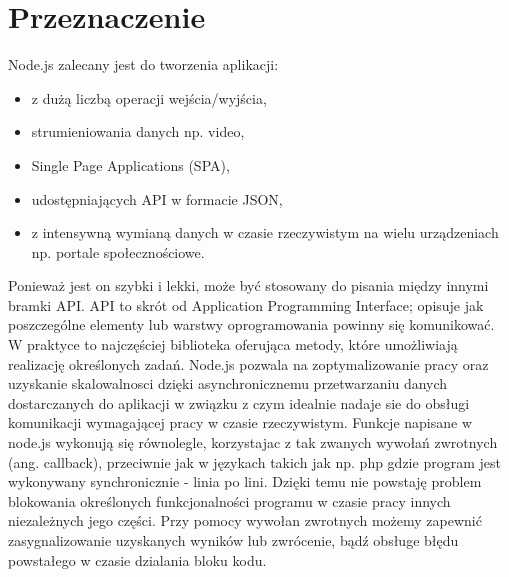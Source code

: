 \documentclass[12pt]{report}
\begin{document}
\section{Przeznaczenie}
Node.js zalecany jest do tworzenia aplikacji: 
\begin{itemize}
\item z dużą liczbą operacji wejścia/wyjścia,
\item strumieniowania danych np. video, 
\item Single Page Applications (SPA),
\item udostępniających API w formacie JSON,
\item z intensywną wymianą danych w czasie rzeczywistym na wielu urządzeniach np. portale społecznościowe.
\end{itemize} 
Ponieważ jest on szybki i lekki, może być stosowany do pisania między innymi bramki API. 
API to skrót od Application Programming Interface; opisuje jak poszczególne elementy lub warstwy oprogramowania powinny się komunikować. 
W praktyce to najczęściej biblioteka oferująca metody, które umożliwiają realizację określonych zadań. 
Node.js pozwala na zoptymalizowanie pracy oraz uzyskanie skalowalnosci dzięki asynchronicznemu przetwarzaniu danych dostarczanych do aplikacji w związku z czym idealnie nadaje sie do obsługi komunikacji wymagającej pracy w czasie rzeczywistym. 
Funkcje napisane w node.js wykonują się równolegle, korzystajac z tak zwanych wywołań zwrotnych (ang. callback), przeciwnie jak w językach takich jak np. php gdzie program jest wykonywany synchronicznie - linia po lini. 
Dzięki temu nie powstaję problem blokowania określonych funkcjonalności programu w czasie pracy innych niezależnych jego części. 
Przy pomocy wywołan zwrotnych możemy zapewnić zasygnalizowanie uzyskanych wyników lub zwrócenie, bądź obsługe błędu powstałego w czasie dzialania bloku kodu.
\end{document}
